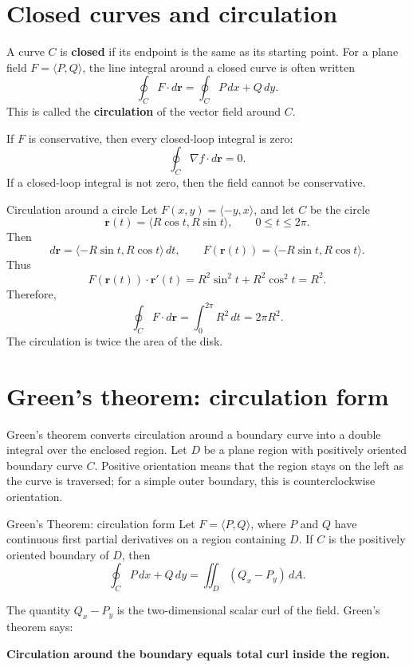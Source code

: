 \documentclass[11pt,oneside]{book}
\newcommand{\vect}[1]{\mathbf{#1}}
\newcommand{\grad}{\nabla}
\begin{document}
\section{Closed curves and circulation}

A curve $C$ is \textbf{closed} if its endpoint is the same as its starting point. For a plane field $F=\langle P,Q\rangle$, the line integral around a closed curve is often written
\[
\oint_C F\cdot d\vect r=\oint_C P\,dx+Q\,dy.
\]
This is called the \textbf{circulation} of the vector field around $C$.

If $F$ is conservative, then every closed-loop integral is zero:
\[
\oint_C \grad f\cdot d\vect r=0.
\]
If a closed-loop integral is not zero, then the field cannot be conservative.

\begin{examplebox}{Circulation around a circle}
Let $F(x,y)=\langle -y,x\rangle$, and let $C$ be the circle
\[
\vect r(t)=\langle R\cos t,R\sin t\rangle,\qquad 0\le t\le 2\pi.
\]
Then
\[
d\vect r=\langle -R\sin t,R\cos t\rangle\,dt,
\qquad
F(\vect r(t))=\langle -R\sin t,R\cos t\rangle.
\]
Thus
\[
F(\vect r(t))\cdot \vect r'(t)=R^2\sin^2 t+R^2\cos^2 t=R^2.
\]
Therefore,
\[
\oint_C F\cdot d\vect r=\int_0^{2\pi}R^2\,dt=2\pi R^2.
\]
The circulation is twice the area of the disk.
\end{examplebox}

\section{Green's theorem: circulation form}

Green's theorem converts circulation around a boundary curve into a double integral over the enclosed region. Let $D$ be a plane region with positively oriented boundary curve $C$. Positive orientation means that the region stays on the left as the curve is traversed; for a simple outer boundary, this is counterclockwise orientation.

\begin{theorembox}{Green's Theorem: circulation form}
Let $F=\langle P,Q\rangle$, where $P$ and $Q$ have continuous first partial derivatives on a region containing $D$. If $C$ is the positively oriented boundary of $D$, then
\[
\oint_C P\,dx+Q\,dy
=\iint_D (Q_x-P_y)\,dA.
\]
\end{theorembox}

The quantity $Q_x-P_y$ is the two-dimensional scalar curl of the field. Green's theorem says:

\begin{center}
\Large\bfseries Circulation around the boundary equals total curl inside the region.
\end{center}
\end{document}
